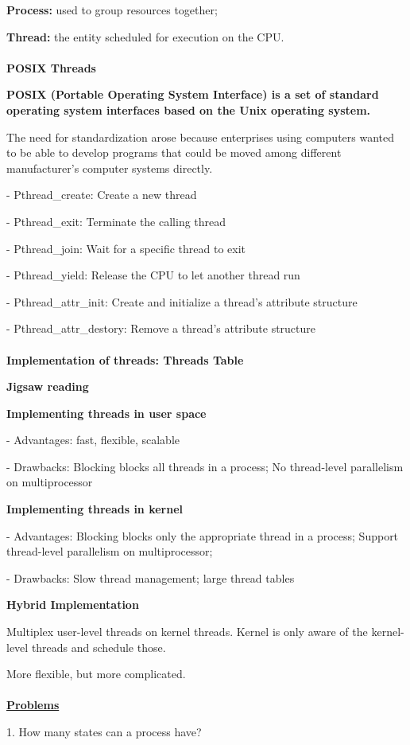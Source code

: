 \documentclass[]{report}
\begin{document}
\textbf{Process: }used to group resources together;

\textbf{Thread: }the entity scheduled for execution on the CPU.\\\\
\textbf{POSIX Threads}

\textbf{POSIX (Portable Operating System Interface)
is a set of standard operating system interfaces
based on the Unix operating system.}

The need for standardization arose because enterprises
using computers wanted to be able to develop programs
that could be moved among different manufacturer's
computer systems directly.

- Pthread\_create: Create a new thread

- Pthread\_exit: Terminate the calling thread

- Pthread\_join: Wait for a specific thread to exit

- Pthread\_yield: Release the CPU to let another thread run

- Pthread\_attr\_init: Create and initialize a thread's attribute structure

- Pthread\_attr\_destory: Remove a thread's attribute structure\\\\
\textbf{Implementation of threads: Threads Table}

\textbf{Jigsaw reading}

\textbf{Implementing threads in user space}

- Advantages: fast, flexible, scalable

- Drawbacks: Blocking blocks all threads in a process; No thread-level parallelism on multiprocessor

\textbf{Implementing threads in kernel}

- Advantages: Blocking blocks only the appropriate
thread in a process; Support thread-level parallelism
on multiprocessor;

- Drawbacks: Slow thread management; large
thread tables

\textbf{Hybrid Implementation}

Multiplex user-level threads on kernel threads. Kernel is
only aware of the kernel-level threads and schedule those.

More flexible, but more complicated.\\\\
\underline{\textbf{Problems}}

1. How many states can a process have?
\end{document}
